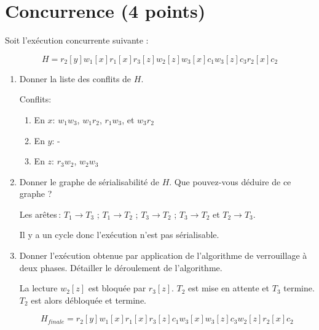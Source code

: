 \section{Concurrence (4 points)}

Soit l'exécution concurrente suivante :

$$H = r_2[y] w_1[x] r_1[x] r_3[z] w_2[z] w_3[x] c_1 w_3[z] c_3 r_2[x] c_2$$


\begin{enumerate}
 \item Donner la liste des conflits de $H$. 

\begin{solution}

Conflits:
\begin{enumerate}
 \item En $x$: $w_1w_3$, $w_1r_2$, $r_1w_3$, et $w_3r_2$
  \item En $y$: -
  \item En $z$: $r_3w_2$, $w_2w_3$
\end{enumerate}

\end{solution}

 \item Donner le graphe de sérialisabilité de $H$. Que pouvez-vous déduire de ce graphe ? 

\begin{solution}
Les arêtes\,: $T_1 \to T_3$ ; $T_1 \to T_2$ ; $T_3 \to T_2$ ; $T_3 \to T_2$  et  $T_2 \to T_3$.

Il y a un cycle donc l'exécution n'est pas sérialisable.
\end{solution}

\item  Donner l'exécution obtenue 
par application de l'algorithme de verrouillage à deux phases. 
Détailler le déroulement de l'algorithme. 


\begin{solution}
La lecture $w_2[z]$ est bloquée par $r_3[z]$. $T_2$ est mise en attente et $T_3$ termine. $T_2$
est alors débloquée et termine.

$$H_{finale} = r_2[y] w_1[x] r_1[x] r_3[z] c_1 w_3[x] w_3[z] c_3 w_2[z] r_2[x] c_2$$
\end{solution}
\end{enumerate}



